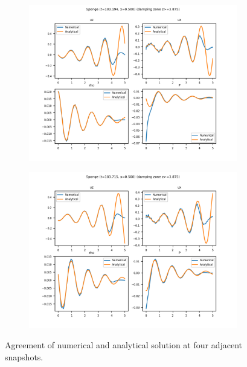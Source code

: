 \documentclass[dvipsnames]{beamer}
\begin{document}
\begin{frame}
\begin{figure}[!h]
        \begin{subfigure}{0.37\textwidth}
            \centering
            \includegraphics[width=\textwidth]{../sims/2d_strat/agree_plots/sponge_2.png}
        \end{subfigure}
        \begin{subfigure}{0.37\textwidth}
            \centering
            \includegraphics[width=\textwidth]{../sims/2d_strat/agree_plots/sponge_3.png}
        \end{subfigure}
        \caption{Agreement of numerical and analytical solution at four adjacent
        snapshots.}\label{fig:sponge_agree}
    \end{figure}
\end{frame}
\end{document}
